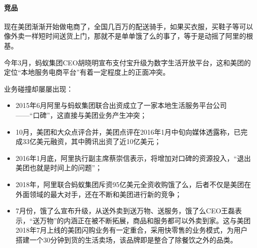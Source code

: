 \documentclass[letterpaper,11pt,english]{sphinxmanual}
\begin{document}
\paragraph{竞品}
\label{\detokenize{chapter_company/meituan:id3}}
现在美团渐渐开始做电商了，全国几百万的配送骑手，如果买衣服，买鞋子等可以像外卖一样短时间送货上门，那就不是单单饿了么的事了，等于是动摇了阿里的根基。%
\begin{footnote}[905]\sphinxAtStartFootnote
{}
%
\end{footnote}

今年3月，蚂蚁集团CEO胡晓明宣布支付宝升级为数字生活开放平台，这和美团的定位“本地服务电商平台”有着一定程度上的正面冲突。%
\begin{footnote}[906]\sphinxAtStartFootnote
{}
%
\end{footnote}

业务碰撞却屡屡出现：
\begin{itemize}
\item {} 
2015年6月阿里与蚂蚁集团联合出资成立了一家本地生活服务平台公司
——“口碑”，这直接与美团业务产生冲突；

\item {} 
10月，美团和大众点评合并，美团点评在2016年1月中旬向媒体透露称，已完成33亿美元融资，其中腾讯出资了近10亿美元；

\item {} 
2016年1月底，阿里执行副主席蔡崇信表示，将增加对口碑的资源投入，“退出美团也就是时间上的问题”；

\item {} 
2018年，阿里联合蚂蚁集团斥资95亿美元全资收购饿了么，后者不仅是美团在外面领域的最大对手，还在不断和美团进行新的竞争；

\item {} 
7月份，饿了么宣布升级，从送外卖到送万物、送服务，饿了么CEO王磊表示，“送万物”的内涵正在被不断拓展，商品和服务都可以外卖到家。这与美团2018年7月上线的美团闪购业务有一定重合，采用快零售的业务模式，为用户搭建一个30分钟到货的生活卖场，该品牌即是整合了除餐饮之外的品类。

\end{itemize}
\end{document}
